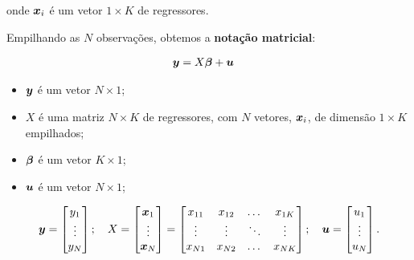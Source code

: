 \documentclass[11pt,oneside,a4paper]{article}
\numberwithin{equation}{section}
\begin{document}
\noindent
onde
$\boldsymbol{x}_{i}$
é um vetor $1 \times K$ de regressores.

Empilhando as $N$ observações, obtemos a \textbf{notação matricial}:

\vspace{-1 em}
\begin{align*}
	\boldsymbol{y} &= X \boldsymbol{\beta} + \boldsymbol{u} 
\end{align*}

\begin{itemize} \itemsep0pt
\item $\boldsymbol{y}$  é um vetor $N \times 1$;

\item $X$  é uma matriz $N \times K$ de regressores, com $N$ vetores, $\boldsymbol{x}_{i}$, de dimensão $1 \times K$ empilhados;

\item $\boldsymbol{\beta}$ é um vetor $K \times 1$;

\item $\boldsymbol{u}$ é um vetor $N \times 1$;

\end{itemize}

\vspace{-1 em}
\begin{align*}
\boldsymbol{y} = 
\begin{bmatrix}
	y_{1} \\ \vdots \\ y_{N}		
\end{bmatrix};
\quad
X = 
\begin{bmatrix}
	\boldsymbol{x}_{1} \\ \vdots \\ \boldsymbol{x}_{N}
\end{bmatrix} = 
\begin{bmatrix}
	x_{11}     & x_{12}     & \dots  & x_{1K} \\          
	\vdots     & \vdots     & \ddots & \vdots \\        
	x_{N1} & x_{N2} & \dots  & x_{NK}		
\end{bmatrix};
\quad
\boldsymbol{u} = 
\begin{bmatrix}
	u_{1} \\ \vdots \\ u_{N}		
\end{bmatrix}.
\end{align*}

\end{document}
